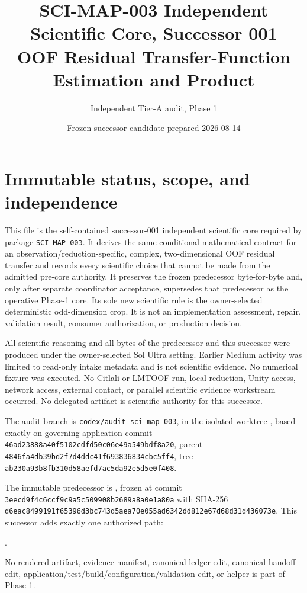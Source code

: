 \documentclass[11pt]{article}
\title{SCI-MAP-003 Independent Scientific Core, Successor 001\\
OOF Residual Transfer-Function Estimation and Product}
\author{Independent Tier-A audit, Phase 1}
\date{Frozen successor candidate prepared 2026-08-14}
\begin{document}
\maketitle

\section{Immutable status, scope, and independence}

This file is the self-contained successor-001 independent scientific core
required by package \texttt{SCI-MAP-003}.  It derives the same conditional
mathematical contract for an observation/reduction-specific, complex,
two-dimensional OOF residual transfer and records every scientific choice that
cannot be made from the admitted pre-core authority.  It preserves the frozen
predecessor byte-for-byte and, only after separate coordinator acceptance,
supersedes that predecessor as the operative Phase-1 core.  Its sole new
scientific rule is the owner-selected deterministic odd-dimension crop.  It is
not an implementation assessment, repair, validation result, consumer
authorization, or production decision.

All scientific reasoning and all bytes of the predecessor and this successor
were produced under the owner-selected Sol Ultra setting.  Earlier Medium
activity was limited to read-only intake metadata and is not scientific
evidence.  No numerical fixture was executed.  No Citlali or LMTOOF run, local
reduction, Unity access, network access, external contact, or parallel
scientific evidence workstream occurred.  No delegated artifact is scientific
authority for this successor.

The audit branch is \texttt{codex/audit-sci-map-003}, in the isolated worktree
, based exactly on governing
application commit
\texttt{46ad23888a40f5102cdfd50c06e49a549bdf8a20}, parent
\texttt{4846fa4db39bd2f7d4ddc41f693836834cbc5ff4}, tree
\texttt{ab230a93b8fb310d58aefd7ac5da92e5d5e0f408}.

The immutable predecessor is
, frozen at commit
\texttt{3eecd9f4c6ccf9c9a5c509908b2689a8a0e1a80a} with SHA-256
\texttt{d6eac8499191f65396d3bc743d5aea70e055ad6342dd812e67d68d31d436073e}.
This successor adds exactly one authorized path:
\begin{center}
.
\end{center}
No rendered artifact, evidence manifest, canonical ledger edit, canonical
handoff edit, application/test/build/configuration/validation edit, or helper
is part of Phase 1.
\end{document}
